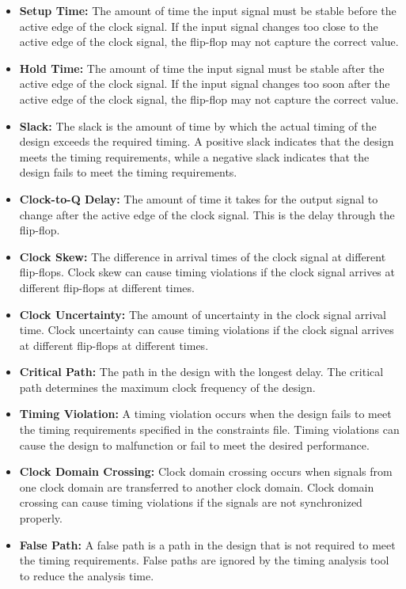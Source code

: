 \documentclass{report}
\begin{document}
\begin{itemize}
    \item \textbf{Setup Time:} The amount of time the input signal must be stable before the active edge of the clock signal. If the input signal changes too close to the active edge of the clock signal, the flip-flop may not capture the correct value.
    \item \textbf{Hold Time:} The amount of time the input signal must be stable after the active edge of the clock signal. If the input signal changes too soon after the active edge of the clock signal, the flip-flop may not capture the correct value.
    \item \textbf{Slack:} The slack is the amount of time by which the actual timing of the design exceeds the required timing. A positive slack indicates that the design meets the timing requirements, while a negative slack indicates that the design fails to meet the timing requirements.
    \item \textbf{Clock-to-Q Delay:} The amount of time it takes for the output signal to change after the active edge of the clock signal. This is the delay through the flip-flop.
    \item \textbf{Clock Skew:} The difference in arrival times of the clock signal at different flip-flops. Clock skew can cause timing violations if the clock signal arrives at different flip-flops at different times.
    \item \textbf{Clock Uncertainty:} The amount of uncertainty in the clock signal arrival time. Clock uncertainty can cause timing violations if the clock signal arrives at different flip-flops at different times.
    \item \textbf{Critical Path:} The path in the design with the longest delay. The critical path determines the maximum clock frequency of the design.
    \item \textbf{Timing Violation:} A timing violation occurs when the design fails to meet the timing requirements specified in the constraints file. Timing violations can cause the design to malfunction or fail to meet the desired performance.
    \item \textbf{Clock Domain Crossing:} Clock domain crossing occurs when signals from one clock domain are transferred to another clock domain. Clock domain crossing can cause timing violations if the signals are not synchronized properly.
    \item \textbf{False Path:} A false path is a path in the design that is not required to meet the timing requirements. False paths are ignored by the timing analysis tool to reduce the analysis time.

\end{itemize}
\end{document}
